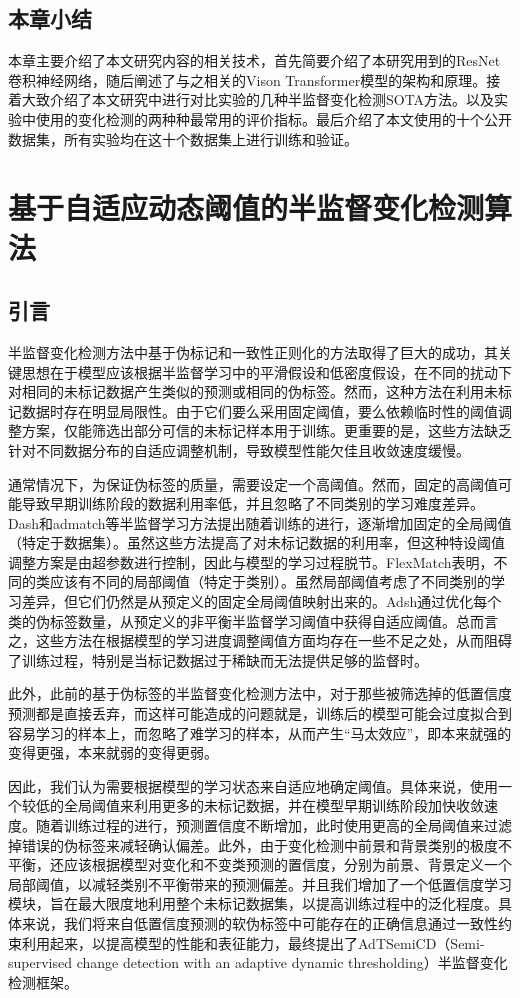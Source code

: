\documentclass[lang=chs, degree=master, blindreview=false, adobe=false]{yanputhesis}
\begin{document}
\section{本章小结}
本章主要介绍了本文研究内容的相关技术，首先简要介绍了本研究用到的ResNet卷积神经网络，随后阐述了与之相关的Vison Transformer模型的架构和原理。接着大致介绍了本文研究中进行对比实验的几种半监督变化检测SOTA方法。以及实验中使用的变化检测的两种种最常用的评价指标。最后介绍了本文使用的十个公开数据集，所有实验均在这十个数据集上进行训练和验证。
\cleardoublepage
\chapter{基于自适应动态阈值的半监督变化检测算法}
\section{引言}
半监督变化检测方法中基于伪标记和一致性正则化的方法取得了巨大的成功，其关键思想在于模型应该根据半监督学习中的平滑假设和低密度假设，在不同的扰动下对相同的未标记数据产生类似的预测或相同的伪标签。然而，这种方法在利用未标记数据时存在明显局限性。由于它们要么采用固定阈值，要么依赖临时性的阈值调整方案，仅能筛选出部分可信的未标记样本用于训练。更重要的是，这些方法缺乏针对不同数据分布的自适应调整机制，导致模型性能欠佳且收敛速度缓慢。

通常情况下，为保证伪标签的质量，需要设定一个高阈值。然而，固定的高阈值可能导致早期训练阶段的数据利用率低，并且忽略了不同类别的学习难度差异。Dash\cite{xu2021dash}和admatch\cite{berthelot2021adamatch}等半监督学习方法提出随着训练的进行，逐渐增加固定的全局阈值（特定于数据集）。虽然这些方法提高了对未标记数据的利用率，但这种特设阈值调整方案是由超参数进行控制，因此与模型的学习过程脱节。FlexMatch\cite{zhang2021flexmatch}表明，不同的类应该有不同的局部阈值（特定于类别）。虽然局部阈值考虑了不同类别的学习差异，但它们仍然是从预定义的固定全局阈值映射出来的。Adsh\cite{guo2022adash}通过优化每个类的伪标签数量，从预定义的非平衡半监督学习阈值中获得自适应阈值。总而言之，这些方法在根据模型的学习进度调整阈值方面均存在一些不足之处，从而阻碍了训练过程，特别是当标记数据过于稀缺而无法提供足够的监督时。

此外，此前的基于伪标签的半监督变化检测方法中，对于那些被筛选掉的低置信度预测都是直接丢弃，而这样可能造成的问题就是，训练后的模型可能会过度拟合到容易学习的样本上，而忽略了难学习的样本，从而产生“马太效应”，即本来就强的变得更强，本来就弱的变得更弱。

因此，我们认为需要根据模型的学习状态来自适应地确定阈值。具体来说，使用一个较低的全局阈值来利用更多的未标记数据，并在模型早期训练阶段加快收敛速度。随着训练过程的进行，预测置信度不断增加，此时使用更高的全局阈值来过滤掉错误的伪标签来减轻确认偏差。此外，由于变化检测中前景和背景类别的极度不平衡，还应该根据模型对变化和不变类预测的置信度，分别为前景、背景定义一个局部阈值，以减轻类别不平衡带来的预测偏差。并且我们增加了一个低置信度学习模块，旨在最大限度地利用整个未标记数据集，以提高训练过程中的泛化程度。具体来说，我们将来自低置信度预测的软伪标签中可能存在的正确信息通过一致性约束利用起来，以提高模型的性能和表征能力，最终提出了AdTSemiCD（Semi-supervised change detection with an adaptive dynamic thresholding）半监督变化检测框架。
\end{document}

